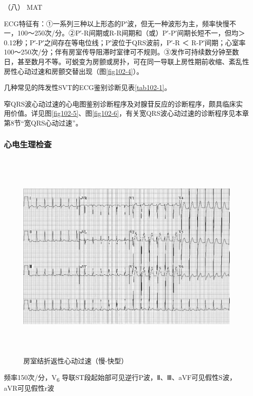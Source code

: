\hypertarget{text00289.htmlux5cux23CHP10-2-2-2-2-8}{}
（八） MAT

ECG特征有：①一系列三种以上形态的P′波，但无一种波形为主，频率快慢不一，100～250次/分。②P′-R间期或R-R间期和（或）P′-P′间期长短不一，但均＞
0.12秒；P′-P′之间存在等电位线；P′波位于QRS波前，P′-R ＜
R-P′间期；心室率100～250次/分；伴有房室传导阻滞时室律可不规则。③发作可持续数分钟至数日，甚至数月不等。可蜕变为房颤或房扑，可在同一导联上房性期前收缩、紊乱性房性心动过速和房颤交替出现（图\ref{fig102-4}）。

几种常见的阵发性SVT的ECG鉴别诊断见表\ref{tab102-1}。

窄QRS波心动过速的心电图鉴别诊断程序及对腺苷反应的诊断程序，颇具临床实用价值。详见图\ref{fig102-5}、图\ref{fig102-6}，有关宽QRS波心动过速的诊断程序见本章第8节“宽QRS心动过速”。

\subsubsection{心电生理检查}

\begin{figure}[!htbp]
 \centering
 \includegraphics[width=6.29167in,height=4.19792in]{./images/Image00413.jpg}
 \captionsetup{justification=centering}
 \caption{房室结折返性心动过速（慢-快型）}
 \label{fig102-2}
  \end{figure} 

频率150次/分，V\textsubscript{6}
导联ST段起始部可见逆行P波，Ⅱ、Ⅲ、aVF可见假性S波，aVR可见假性r波


